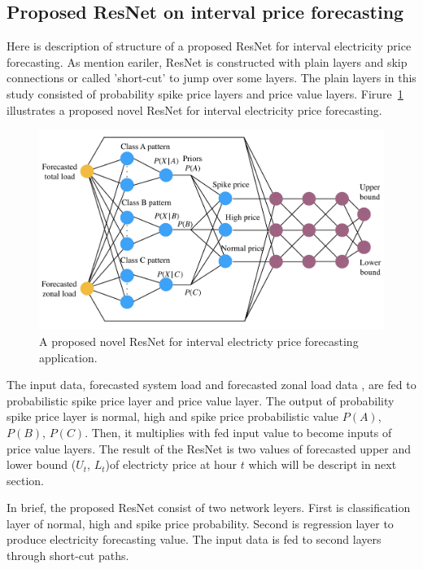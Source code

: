 \documentclass[review]{elsarticle}
\begin{document}
    \subsection{Proposed ResNet on interval price forecasting}
      Here is description of structure of a proposed ResNet for interval electricity price forecasting.
      As mention eariler, ResNet is constructed with plain layers and skip connections or called 'short-cut' to jump over some layers.
      The plain layers in this study consisted of probability spike price layers and price value layers.
      Firure~\ref{Fig:proposed_ResNet} illustrates a proposed novel ResNet for interval electricity price forecasting.
      \begin{figure}[H]
        \includegraphics[width=12cm]{proposed_PDRNN}
        \caption{A proposed novel ResNet for interval electricty price forecasting application.}
        \label{Fig:proposed_ResNet}
        \centering
      \end{figure}
      The input data, forecasted system load and forecasted zonal load data , are fed to probabilistic spike price layer and price value layer.
      The output of probability spike price layer is normal, high and spike price probabilistic value $P(A)$, $P(B)$, $P(C)$.
      Then, it multiplies with fed input value to become inputs of price value layers.
      The result of the ResNet is two values of forecasted upper and lower bound ($U_{t}$, $L_{t}$)of electricty price at hour $t$ which will be descript in next section.

      In brief, the proposed ResNet consist of two network leyers.
      First is classification layer of normal, high and spike price probability.
      Second is regression layer to produce electricity  forecasting value.
      The input data is fed to second layers through short-cut paths.
\end{document}
